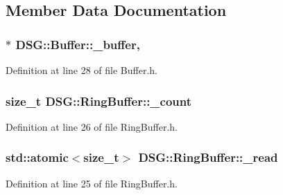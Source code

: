 \subsection{Member Data Documentation}
\hypertarget{classDSG_1_1Buffer_a6506d4763401650acb463cb5d4913e31}{
\subsubsection[{\+\_\+buffer}]{$\ast$ D\+S\+G\+::\+Buffer\+::\+\_\+buffer\hspace{0.3cm}{\ttfamily [protected]}, {\ttfamily [inherited]}}}\label{classDSG_1_1Buffer_a6506d4763401650acb463cb5d4913e31}


Definition at line 28 of file Buffer.\+h.

\hypertarget{classDSG_1_1RingBuffer_af6d0e1658a1f1aa298218b890e458f2f}{
\subsubsection[{\+\_\+count}]{\setlength{\rightskip}{0pt plus 5cm}size\+\_\+t D\+S\+G\+::\+Ring\+Buffer\+::\+\_\+count\hspace{0.3cm}{\ttfamily [protected]}}}\label{classDSG_1_1RingBuffer_af6d0e1658a1f1aa298218b890e458f2f}


Definition at line 26 of file Ring\+Buffer.\+h.

\hypertarget{classDSG_1_1RingBuffer_aa71bb75a5d24700be795a30e1a135a54}{
\subsubsection[{\+\_\+read}]{\setlength{\rightskip}{0pt plus 5cm}std\+::atomic$<$size\+\_\+t$>$ D\+S\+G\+::\+Ring\+Buffer\+::\+\_\+read\hspace{0.3cm}{\ttfamily [protected]}}}\label{classDSG_1_1RingBuffer_aa71bb75a5d24700be795a30e1a135a54}


Definition at line 25 of file Ring\+Buffer.\+h.


